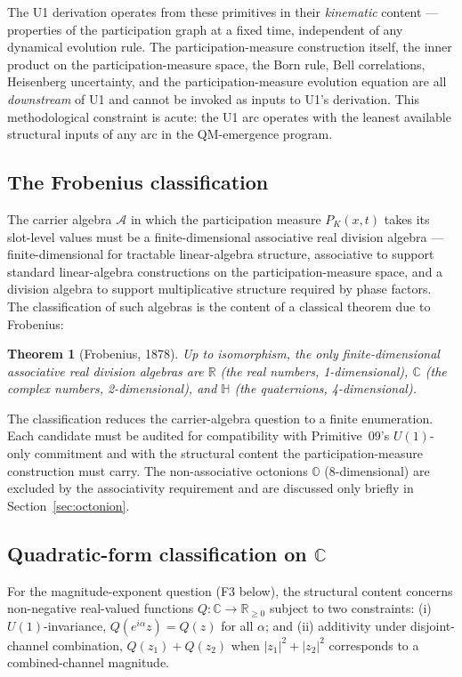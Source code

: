 \documentclass[11pt,a4paper]{article}
\newtheorem{theorem}{Theorem}[section]
\begin{document}
The U1 derivation operates from these primitives in their \emph{kinematic} content --- properties of the participation graph at a fixed time, independent of any dynamical evolution rule. The participation-measure construction itself, the inner product on the participation-measure space, the Born rule, Bell correlations, Heisenberg uncertainty, and the participation-measure evolution equation are all \emph{downstream} of U1 and cannot be invoked as inputs to U1's derivation. This methodological constraint is acute: the U1 arc operates with the leanest available structural inputs of any arc in the QM-emergence program.

\subsection{The Frobenius classification}

The carrier algebra $\mathcal{A}$ in which the participation measure $P_K(x, t)$ takes its slot-level values must be a finite-dimensional associative real division algebra --- finite-dimensional for tractable linear-algebra structure, associative to support standard linear-algebra constructions on the participation-measure space, and a division algebra to support multiplicative structure required by phase factors. The classification of such algebras is the content of a classical theorem due to Frobenius:

\begin{theorem}[Frobenius, 1878]
Up to isomorphism, the only finite-dimensional associative real division algebras are $\mathbb{R}$ (the real numbers, 1-dimensional), $\mathbb{C}$ (the complex numbers, 2-dimensional), and $\mathbb{H}$ (the quaternions, 4-dimensional).
\end{theorem}

The classification reduces the carrier-algebra question to a finite enumeration. Each candidate must be audited for compatibility with Primitive~09's $U(1)$-only commitment and with the structural content the participation-measure construction must carry. The non-associative octonions $\mathbb{O}$ (8-dimensional) are excluded by the associativity requirement and are discussed only briefly in Section~\ref{sec:octonion}.

\subsection{Quadratic-form classification on $\mathbb{C}$}

For the magnitude-exponent question (F3 below), the structural content concerns non-negative real-valued functions $Q : \mathbb{C} \to \mathbb{R}_{\geq 0}$ subject to two constraints: (i) $U(1)$-invariance, $Q(e^{i \alpha} z) = Q(z)$ for all $\alpha$; and (ii) additivity under disjoint-channel combination, $Q(z_1) + Q(z_2)$ when $|z_1|^2 + |z_2|^2$ corresponds to a combined-channel magnitude.
\end{document}
